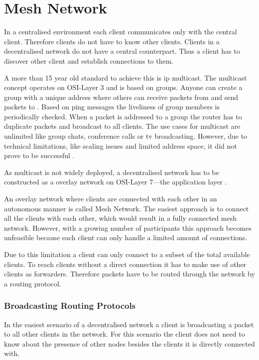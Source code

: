 \section{Mesh Network}
In a centralised environment each client communicates only with the central client. Therefore clients do not have to know other clients.
Clients in a decentralised network do not have a central counterpart. Thus a client has to discover other client and establish connections to them.

A more than 15 year old standard to achieve this is \gls{ip} multicast. The multicast concept operates on OSI-Layer 3 and is based on groups. Anyone can create a group with a unique address where others can receive packets from and send packets to \cite[pp. 484-485]{tanenbaum_wetherall_2011}. Based on ping messages the liveliness of group members is periodically checked. When a packet is addressed to a group the router has to duplicate packets and broadcast to all clients. 
The use cases for multicast are unlimited like group chats, conference calls or tv broadcasting.
However, due to technical limitations, like scaling issues and limited address space, it did not prove to be successful \cite{multicast}.

As multicast is not widely deployed, a decentralised network has to be constructed as a overlay network on OSI-Layer 7—the application layer \cite[\S1]{multicast-problems}.

An overlay network where clients are connected with each other in an autonomous manner is called Mesh Network. The easiest approach is to connect all the clients with each other, which would result in a fully connected mesh network. However, with a growing number of participants this approach becomes unfeasible because each client can only handle a limited amount of connections.

Due to this limitation a client can only connect to a subset of the total available clients. To reach clients without a direct connection it has to make use of other clients as forwarders. Therefore packets have to be routed through the network by a routing protocol.

\subsubsection{Broadcasting Routing Protocols}
In the easiest scenario of a decentralised network a client is broadcasting a packet to all other clients in the network. For this scenario the client does not need to know about the presence of other nodes besides the clients it is directly connected with.

